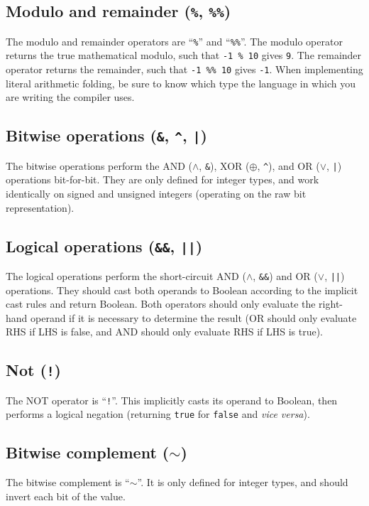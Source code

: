 \documentclass{article}
\begin{document}
\subsection{Modulo and remainder (\texttt{\%}, \texttt{\%\%})}
\label{sub:operators:modrem}
The modulo and remainder operators are ``\texttt{\%}'' and ``\texttt{\%\%}''.
The modulo operator returns the true mathematical modulo, such that
\texttt{-1~\%~10} gives \texttt{9}. The remainder operator returns the
remainder, such that \texttt{-1~\%\%~10} gives \texttt{-1}. When implementing
literal arithmetic folding, be sure to know which type the language in which
you are writing the compiler uses.

\subsection{Bitwise operations (\texttt{\&}, \texttt{\^}, \texttt{|})}
\label{sub:operators:bitwise}
The bitwise operations perform the AND ($\land$, \texttt{\&}),
XOR ($\oplus$, \texttt{\^{}}), and OR ($\lor$, \texttt{|}) operations
bit-for-bit. They are only defined for integer types, and work identically on
signed and unsigned integers (operating on the raw bit representation).

\subsection{Logical operations (\texttt{\&\&}, \texttt{||})}
\label{sub:operators:logical}
The logical operations perform the short-circuit AND ($\land$, \texttt{\&\&})
and OR ($\lor$, \texttt{||}) operations. They should cast both operands to
Boolean according to the implicit cast rules and return Boolean. Both
operators should only evaluate the right-hand operand if it is necessary to
determine the result (OR should only evaluate RHS if LHS is false, and AND
should only evaluate RHS if LHS is true).

\subsection{Not (\texttt{!})}
\label{sub:operators:not}
The NOT operator is ``\texttt{!}''. This implicitly casts its operand to
Boolean, then performs a logical negation (returning \texttt{true} for
\texttt{false} and {\it vice versa}).

\subsection{Bitwise complement (\texttt{$\sim$})}
\label{sub:operators:complement}
The bitwise complement is ``\texttt{$\sim$}''. It is only defined for integer
types,
and should invert each bit of the value.
\end{document}
